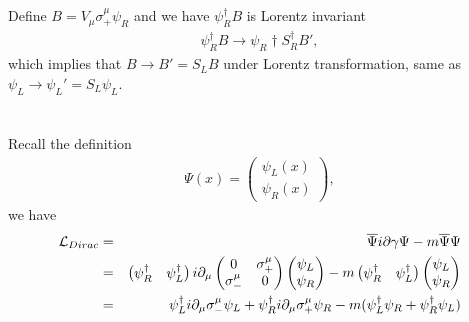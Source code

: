 \documentclass[11pt]{article}
\def\del{{\partial}}
\begin{document}
\section{ }
Define $B=V_\mu \sigma_+^\mu\psi_R$ and we have $\psi_R^\dagger B$ is Lorentz invariant
\begin{eqnarray}
    \psi_R^\dagger B \to \psi_R\dagger S_R^\dagger B',
\end{eqnarray}
which implies that $B\to B'=S_L B$ under Lorentz transformation, same as $\psi_L\to\psi_L'=S_L \psi_L$.

\section{ }
Recall the definition
\begin{eqnarray}
    \Psi(x) =
    \begin{pmatrix}
      \psi_L(x) \\ \psi_R(x)
    \end{pmatrix},
  \end{eqnarray}
we have
\begin{eqnarray}
    {\cal L}_{Dirac} &=& {\overline \Psi} i\del \gamma \Psi - m {\overline \Psi} \Psi \\
    &=&
    \begin{pmatrix}
        \psi_R^\dagger & \psi_L^\dagger
    \end{pmatrix}
    i\del_\mu 
    \begin{pmatrix}
        0 & \sigma_+^\mu \\
        \sigma_-^\mu &0
    \end{pmatrix}
    \begin{pmatrix}
        \psi_L \\ \psi_R
    \end{pmatrix}
    -m
    \begin{pmatrix}
        \psi_R^\dagger & \psi_L^\dagger
    \end{pmatrix}
    \begin{pmatrix}
        \psi_L \\ \psi_R
    \end{pmatrix}\\
    &=&\psi_L^\dagger i\del_\mu \sigma_-^\mu \psi_L 
    + \psi_R^\dagger i\del_\mu \sigma_+^\mu \psi_R
    -m (\psi_L^\dagger \psi_R + \psi_R^\dagger \psi_L) 
\end{eqnarray}
\end{document}
